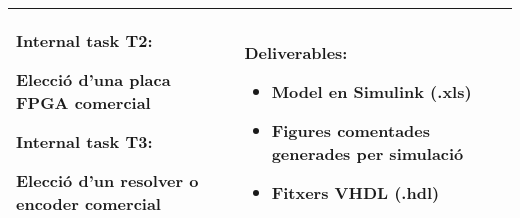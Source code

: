 \begin{center}
\begin{tabular}{| p{8.5cm} | p{5.25cm} |}
            \textbf{Internal task T2:} 
                \newline \hspace*{0.3cm}
                \begin{minipage}[t]{8cm}
                    Elecció d’una placa FPGA comercial
                \end{minipage}
                \smallskip

            \textbf{Internal task T3:}
                \newline \hspace*{0.3cm}
                \begin{minipage}[t]{8cm}
                    Elecció d’un resolver o encoder comercial
                \end{minipage}
                \smallskip
            & 
            \textbf{ Deliverables: }
                \begin{itemize}
                    \item { Model en Simulink (.xls) }
                    \item { Figures comentades generades per simulació }
                    \item { Fitxers VHDL (.hdl) }
                \end{itemize} \\
        \hline
    \end{tabular}
\end{center}



